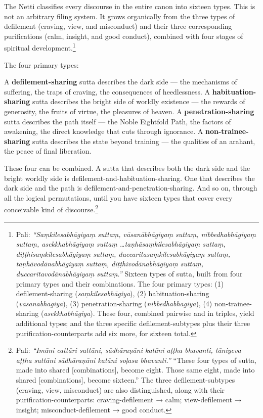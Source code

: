 The Netti classifies every discourse in the entire canon into sixteen types. This is not an arbitrary filing system. It grows organically from the three types of defilement (craving, view, and misconduct) and their three corresponding purifications (calm, insight, and good conduct), combined with four stages of spiritual development.\footnote{Pali: \textit{``Saṃkilesabhāgiyaṃ suttaṃ, vāsanābhāgiyaṃ suttaṃ, nibbedhabhāgiyaṃ suttaṃ, asekkhabhāgiyaṃ suttaṃ \ldots taṇhāsaṃkilesabhāgiyaṃ suttaṃ, diṭṭhisaṃkilesabhāgiyaṃ suttaṃ, duccaritasaṃkilesabhāgiyaṃ suttaṃ, taṇhāvodānabhāgiyaṃ suttaṃ, diṭṭhivodānabhāgiyaṃ suttaṃ, duccaritavodānabhāgiyaṃ suttaṃ.''} Sixteen types of sutta, built from four primary types and their combinations. The four primary types: (1) defilement-sharing (\textit{saṃkilesabhāgiya}), (2) habituation-sharing (\textit{vāsanābhāgiya}), (3) penetration-sharing (\textit{nibbedhabhāgiya}), (4) non-trainee-sharing (\textit{asekkhabhāgiya}). These four, combined pairwise and in triples, yield additional types; and the three specific defilement-subtypes plus their three purification-counterparts add six more, for sixteen total.}

The four primary types:

A \textbf{defilement-sharing} sutta describes the dark side --- the mechanisms of suffering, the traps of craving, the consequences of heedlessness. A \textbf{habituation-sharing} sutta describes the bright side of worldly existence --- the rewards of generosity, the fruits of virtue, the pleasures of heaven. A \textbf{penetration-sharing} sutta describes the path itself --- the Noble Eightfold Path, the factors of awakening, the direct knowledge that cuts through ignorance. A \textbf{non-trainee-sharing} sutta describes the state beyond training --- the qualities of an arahant, the peace of final liberation.

These four can be combined. A sutta that describes both the dark side and the bright worldly side is defilement-and-habituation-sharing. One that describes the dark side and the path is defilement-and-penetration-sharing. And so on, through all the logical permutations, until you have sixteen types that cover every conceivable kind of discourse.\footnote{Pali: \textit{``Imāni cattāri suttāni, sādhāraṇāni katāni aṭṭha bhavanti, tāniyeva aṭṭha suttāni sādhāraṇāni katāni soḷasa bhavanti.''} ``These four types of sutta, made into shared [combinations], become eight. Those same eight, made into shared [combinations], become sixteen.'' The three defilement-subtypes (craving, view, misconduct) are also distinguished, along with their purification-counterparts: craving-defilement → calm; view-defilement → insight; misconduct-defilement → good conduct.}

